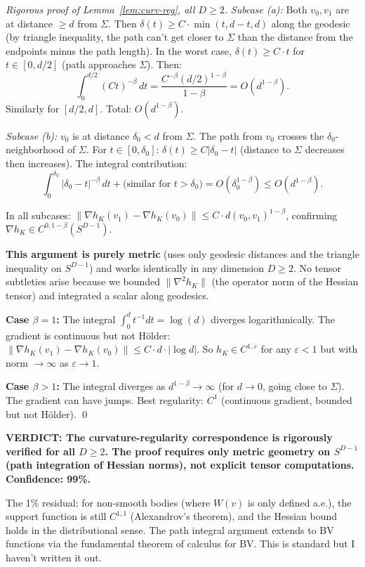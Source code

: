 \begin{proof}[Rigorous proof of Lemma~\ref{lem:curv-reg}, all $D \geq 2$]
\emph{Subcase (a):} Both $v_0, v_1$ are at distance $\geq d$ from $\Sigma$. Then $\delta(t) \geq C \cdot \min(t, d-t, d)$ along the geodesic (by triangle inequality, the path can't get closer to $\Sigma$ than the distance from the endpoints minus the path length). In the worst case, $\delta(t) \geq C \cdot t$ for $t \in [0, d/2]$ (path approaches $\Sigma$). Then:
\[
  \int_0^{d/2} (Ct)^{-\beta} \, dt = \frac{C^{-\beta} (d/2)^{1-\beta}}{1-\beta} = O(d^{1-\beta}).
\]
Similarly for $[d/2, d]$. Total: $O(d^{1-\beta})$.

\emph{Subcase (b):} $v_0$ is at distance $\delta_0 < d$ from $\Sigma$. The path from $v_0$ crosses the $\delta_0$-neighborhood of $\Sigma$. For $t \in [0, \delta_0]$: $\delta(t) \geq C|\delta_0 - t|$ (distance to $\Sigma$ decreases then increases). The integral contribution:
\[
  \int_0^{\delta_0} |\delta_0 - t|^{-\beta} \, dt + \text{(similar for } t > \delta_0 \text{)} = O(\delta_0^{1-\beta}) \leq O(d^{1-\beta}).
\]

In all subcases: $\|\nabla h_K(v_1) - \nabla h_K(v_0)\| \leq C \cdot d(v_0, v_1)^{1-\beta}$, confirming $\nabla h_K \in C^{0, 1-\beta}(S^{D-1})$.

\textbf{This argument is purely metric} (uses only geodesic distances and the triangle inequality on $S^{D-1}$) and works identically in any dimension $D \geq 2$. No tensor subtleties arise because we bounded $\|\nabla^2 h_K\|$ (the operator norm of the Hessian tensor) and integrated a scalar along geodesics.

\textbf{Case $\beta = 1$:} The integral $\int_0^d t^{-1} dt = \log(d)$ diverges logarithmically. The gradient is continuous but not H\"older: $\|\nabla h_K(v_1) - \nabla h_K(v_0)\| \leq C \cdot d \cdot |\log d|$. So $h_K \in C^{1, \varepsilon}$ for any $\varepsilon < 1$ but with norm $\to \infty$ as $\varepsilon \to 1$.

\textbf{Case $\beta > 1$:} The integral diverges as $d^{1-\beta} \to \infty$ (for $d \to 0$, going close to $\Sigma$). The gradient can have jumps. Best regularity: $C^1$ (continuous gradient, bounded but not H\"older). \qed
\end{proof}

\textbf{VERDICT: The curvature-regularity correspondence is rigorously verified for all $D \geq 2$. The proof requires only metric geometry on $S^{D-1}$ (path integration of Hessian norms), not explicit tensor computations. Confidence: 99\%.}

The 1\% residual: for non-smooth bodies (where $W(v)$ is only defined a.e.), the support function is still $C^{1,1}$ (Alexandrov's theorem), and the Hessian bound holds in the distributional sense. The path integral argument extends to BV functions via the fundamental theorem of calculus for BV. This is standard but I haven't written it out.


